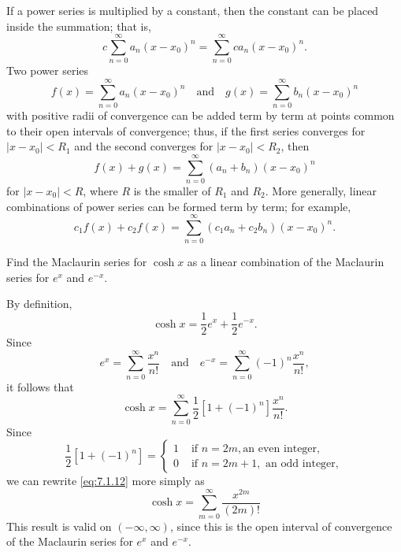 \documentclass{ximera}
\begin{document}
If a power series is multiplied by a constant, then the constant can be
placed inside the summation; that is,
$$
c\sum_{n=0}^\infty a_n(x-x_0)^n=\sum_{n=0}^\infty ca_n(x-x_0)^n.
$$
Two power series
$$
f(x)=\sum_{n=0}^\infty a_n(x-x_0)^n\quad\mbox{and}\quad
g(x)=\sum_{n=0}^\infty b_n(x-x_0)^n
$$
with positive radii of convergence can be added term by term at points
common to their open intervals of convergence;   thus, if the first
series converges for $|x-x_0|<R_1$ and the second converges for
$|x-x_0|<R_2$, then
$$
f(x)+g(x)=\sum_{n=0}^\infty(a_n+b_n)(x-x_0)^n
$$
for $|x-x_0|<R$, where $R$ is the smaller of $R_1$ and $R_2$.
More generally, linear combinations of power series can be formed term
by term;   for example,
$$
c_1f(x)+c_2f(x)=\sum_{n=0}^\infty(c_1a_n+c_2b_n)(x-x_0)^n.
$$

\begin{example}\label{example:7.1.5}
Find the Maclaurin series for $\cosh x$  as a linear
combination of the Maclaurin series for $e^x$ and $e^{-x}$.

\begin{explanation}
By definition,
$$
\cosh x=\frac{1}{2}e^x+\frac{1}{2}e^{-x}.
$$
Since
$$ e^x=\sum_{n=0}^\infty  \frac{x^n}{n!}\quad\mbox{and}\quad
 e^{-x}=\sum_{n=0}^\infty (-1)^n \frac{x^n}{n!},
$$
it follows that
\begin{equation} \label{eq:7.1.12}
\cosh x=\sum_{n=0}^\infty \frac{1}{2}[1+(-1)^n]\frac{x^n}{n!}.
\end{equation}
Since
$$
\frac{1}{2}[1+(-1)^n]=\left\{\begin{array}{cl}1&\mbox{ if } n=2m,\mbox{
an even integer},\\ 0&\mbox{ if }n=2m+1,\mbox{ an odd integer},
\end{array}\right.
$$
we can rewrite \eqref{eq:7.1.12} more simply as
$$
\cosh x=\sum_{m=0}^\infty\frac{x^{2m}}{(2m)!}
$$
This result is valid on $(-\infty,\infty)$, since this is the open
interval of convergence of the Maclaurin series for $e^x$ and
$e^{-x}$.
\end{explanation}
\end{example}
\end{document}
